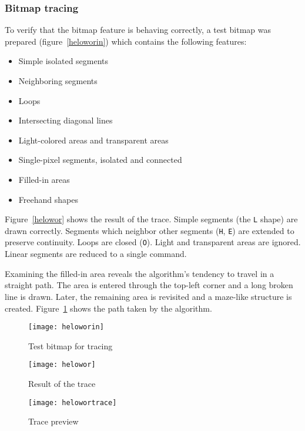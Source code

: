 \subsubsection{Bitmap tracing}

To verify that the bitmap feature is behaving correctly, a test bitmap was
prepared (figure~\ref{heloworin}) which contains the following features:
\begin{itemize}
    \item Simple isolated segments
    \item Neighboring segments
    \item Loops
    \item Intersecting diagonal lines
    \item Light-colored areas and transparent areas
    \item Single-pixel segments, isolated and connected
    \item Filled-in areas
    \item Freehand shapes
\end{itemize}
Figure~\ref{helowor} shows the result of the trace. Simple segments (the
\texttt{L} shape) are drawn correctly. Segments which neighbor other segments
(\texttt{H}, \texttt{E}) are extended to preserve continuity. Loops are closed
(\texttt{O}). Light and transparent areas are ignored. Linear segments are
reduced to a single command.

Examining the filled-in area reveals the algorithm's tendency to travel in a
straight path. The area is entered through the top-left corner and a long broken
line is drawn. Later, the remaining area is revisited and a maze-like structure
is created. Figure~\ref{helowortrace} shows the path taken by the algorithm.

\begin{figure}[ht]
    \begin{minipage}{0.5\textwidth}
        \centering
        \texttt{[image: heloworin]}
        \caption{Test bitmap for tracing}
        \label{heloworin}
    \end{minipage}\hfill
    \begin{minipage}{0.5\textwidth}
        \centering
        \texttt{[image: helowor]}
        \caption{Result of the trace}
        \label{helowor}
    \end{minipage}
    \begin{minipage}{0.5\textwidth}
        \centering
        \texttt{[image: helowortrace]}
        \caption{Trace preview}
        \label{helowortrace}
    \end{minipage}
\end{figure}


